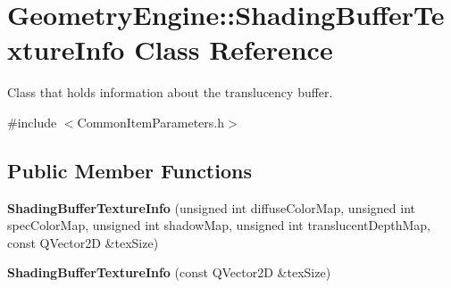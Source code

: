 \hypertarget{class_geometry_engine_1_1_shading_buffer_texture_info}{}\section{Geometry\+Engine\+::Shading\+Buffer\+Texture\+Info Class Reference}
\label{class_geometry_engine_1_1_shading_buffer_texture_info}


Class that holds information about the translucency buffer.  




{\ttfamily \#include $<$Common\+Item\+Parameters.\+h$>$}

\subsection*{Public Member Functions}
\begin{DoxyCompactItemize}
\item 
\mbox{\label{class_geometry_engine_1_1_shading_buffer_texture_info_a653499de9030089e52cfc7ef26f1ae9e}} 
{\bfseries Shading\+Buffer\+Texture\+Info} (unsigned int diffuse\+Color\+Map, unsigned int spec\+Color\+Map, unsigned int shadow\+Map, unsigned int translucent\+Depth\+Map, const Q\+Vector2D \&tex\+Size)
\item 
\mbox{\label{class_geometry_engine_1_1_shading_buffer_texture_info_abf95610838397e58a89594534d5a952c}} 
{\bfseries Shading\+Buffer\+Texture\+Info} (const Q\+Vector2D \&tex\+Size)
\end{DoxyCompactItemize}
